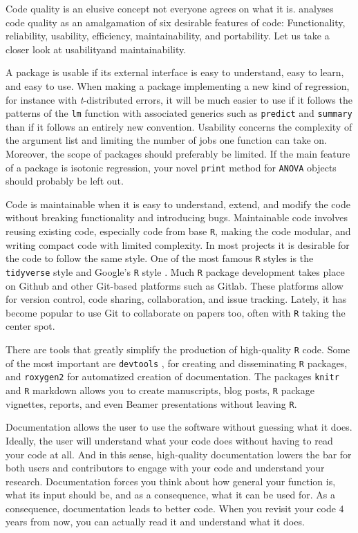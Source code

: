 Code quality is an elusive concept not everyone agrees on what it is. \textcite[Section 1.1.2]{Spinellis2006-dd} analyses code quality as an amalgamation of six desirable features of code: Functionality, reliability, usability, efficiency, maintainability, and
portability. Let us take a closer look at usabilityand maintainability.

A package is usable if its external interface is easy to understand, easy to learn, and easy to use. When making a package implementing a new kind of regression, for instance with \textit{t}-distributed errors, it will be much easier to use if it follows the patterns of the \texttt{lm} function with associated generics such as \texttt{predict} and \texttt{summary} than if it follows an entirely new convention. Usability concerns the complexity of the argument list and limiting the number of jobs one function can take on. Moreover, the scope of packages should preferably be limited. If the main feature of a package is isotonic regression, your novel \texttt{print} method for \texttt{ANOVA} objects should probably be left out.

Code is maintainable when it is easy to understand, extend, and modify the code without breaking functionality and introducing bugs. Maintainable code involves reusing existing code, especially code from base \texttt{R}, making the code modular, and writing compact code with limited complexity.  In most projects it is desirable for the code to follow the same style. One of the most famous \texttt{R} styles is the \texttt{tidyverse} style \parencite{Wickham_undated-sw} and Google's \texttt{R} style \parencite{noauthor_undated-pk}. 
Much \texttt{R} package development takes place on Github and other Git-based platforms such as Gitlab. These platforms allow for version control, code sharing, collaboration, and issue tracking. Lately, it has become popular to use Git to collaborate on papers too, often with \texttt{R} taking the center spot.

There are tools that greatly simplify the production of high-quality \texttt{R} code. Some of the most important are \texttt{devtools} \parencite{devtools}, for creating and disseminating \texttt{R} packages, and \texttt{roxygen2} \parencite{roxygen2} for automatized creation of documentation. The packages \texttt{knitr} \parencite{Xie2014} and \texttt{R} markdown allows you to create manuscripts, blog posts, \texttt{R} package vignettes, reports, and even Beamer presentations without leaving \texttt{R}.

Documentation allows the user to use the software without guessing what it does. Ideally, the user will understand what your code does without having to read your code at all. And in this sense, high-quality documentation lowers the bar for both users and contributors to engage with your code and understand your research. Documentation forces you think about how general your function is, what its input should be, and as a consequence, what it can be used for. As a consequence, documentation leads to better code. When you revisit your code $4$ years from now, you can actually read it and understand what it does. 

